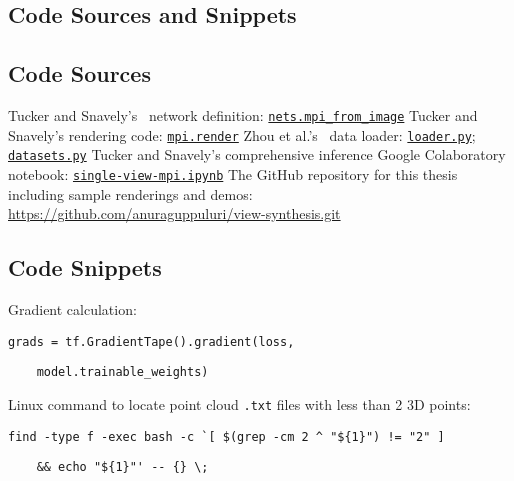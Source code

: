 \begin{appendices}
\chapter{Code Sources and Snippets}\label{app:code-sources-snippets}

\section{Code Sources}\label{sec:code-sources}

\begin{outline}
    \1 Tucker and Snavely's~\cite{single_view_mpi} network definition: \href{https://github.com/google-research/google-research/blob/ea313c6e96acce6c863de41615c6cf4079b8ca94/single_view_mpi/libs/nets.py#L146}{\texttt{nets.mpi\_from\_image}}
    \1 Tucker and Snavely's rendering code: \href{https://github.com/google-research/google-research/blob/ea313c6e96acce6c863de41615c6cf4079b8ca94/single_view_mpi/libs/mpi.py#L232}{\texttt{mpi.render}}
    \1 Zhou et al.'s~\cite{zhou2018stereo} data loader: \href{https://github.com/google/stereo-magnification/blob/f2041f80ed8c340173a6048375ba900201c1f1e7/stereomag/loader.py}{\texttt{loader.py}}; \href{https://github.com/google/stereo-magnification/blob/f2041f80ed8c340173a6048375ba900201c1f1e7/stereomag/datasets.py}{\texttt{datasets.py}}
    \1 Tucker and Snavely's comprehensive inference Google Colaboratory notebook: \href{https://colab.research.google.com/github/google-research/google-research/blob/master/single_view_mpi/example.ipynb}{\texttt{single-view-mpi.ipynb}}
    \1 The GitHub repository for this thesis including sample renderings and demos: \url{https://github.com/anuraguppuluri/view-synthesis.git}
\end{outline}

\section{Code Snippets}\label{sec:code-snippets}

\begin{outline}
    \1 Gradient calculation:\begin{verbatim}grads = tf.GradientTape().gradient(loss,\end{verbatim}\begin{verbatim}    model.trainable_weights)\end{verbatim}
    \1 Linux command to locate point cloud \texttt{.txt} files with less than 2 3D points:\begin{verbatim}find -type f -exec bash -c `[ $(grep -cm 2 ^ "${1}") != "2" ]\end{verbatim}\begin{verbatim}    && echo "${1}"' -- {} \;\end{verbatim}
\end{outline}

\end{appendices}